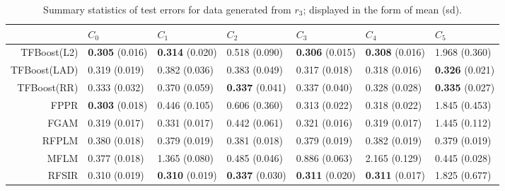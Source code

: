 \begin{table}[H]
\centering
\footnotesize
\begin{tabular}{rllllll}
  \hline
 & $C_0$ & $C_1$ & $C_2$ & $C_3$ & $C_4$ & $C_5$ \\ 
  \hline
TFBoost(L2) & \textbf{0.305} (0.016) & \textbf{0.314} (0.020) & 0.518 (0.090) & \textbf{0.306} (0.015) & \textbf{0.308} (0.016) & 1.968 (0.360) \\ 
  TFBoost(LAD) & 0.319 (0.019) & 0.382 (0.036) & 0.383 (0.049) & 0.317 (0.018) & 0.318 (0.016) & \textbf{0.326} (0.021) \\ 
  TFBoost(RR) & 0.333 (0.032) & 0.370 (0.059) & \textbf{0.337} (0.041) & 0.337 (0.040) & 0.328 (0.028) & \textbf{0.335} (0.027) \\ 
  FPPR & \textbf{0.303} (0.018) & 0.446 (0.105) & 0.606 (0.360) & 0.313 (0.022) & 0.318 (0.022) & 1.845 (0.453) \\ 
  FGAM & 0.319 (0.017) & 0.331 (0.017) & 0.442 (0.061) & 0.321 (0.016) & 0.319 (0.017) & 1.445 (0.112) \\ 
  RFPLM & 0.380 (0.018) & 0.379 (0.019) & 0.381 (0.018) & 0.379 (0.019) & 0.382 (0.019) & 0.379 (0.019) \\ 
  MFLM & 0.377 (0.018) & 1.365 (0.080) & 0.485 (0.046) & 0.886 (0.063) & 2.165 (0.129) & 0.445 (0.028) \\ 
  RFSIR & 0.310 (0.019) & \textbf{0.310} (0.019) & \textbf{0.337} (0.030) & \textbf{0.311} (0.020) & \textbf{0.311} (0.017) & 1.825 (0.677) \\ 
   \hline
\end{tabular}
\caption{Summary statistics of test errors for data generated from $r_3$; displayed in the form of mean (sd).} 
\end{table}

